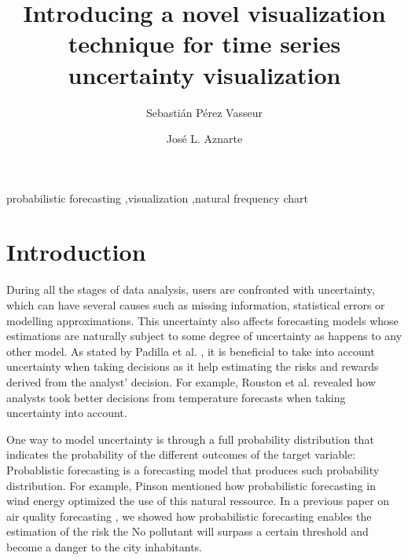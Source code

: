 \documentclass[a4paper,3p,sort&compress]{elsarticle}
\begin{document}
\linenumbers

\newcommand{\no}{NO\textsubscript{2}\xspace}

\begin{frontmatter}

  \title{Introducing a novel visualization technique for time series uncertainty visualization}


  \author{Sebasti\'an P\'erez Vasseur}
  \author{Jos\'e L. Aznarte}
  \address{Artificial Intelligence Department\\Universidad Nacional de
    Educaci\'on a Distancia --- UNED\\c/ Juan del Rosal, 16, Madrid, Spain}
  

\begin{abstract}
  
\end{abstract}

\begin{keyword}
probabilistic forecasting \sep visualization \sep natural frequency chart
\end{keyword}

\end{frontmatter}


\section{Introduction}
\label{sec:intro}

During all the stages of data analysis, users are confronted with uncertainty, which can have 
several causes such as missing information, statistical errors or modelling approximations.
This uncertainty also affects forecasting models whose estimations are naturally 
subject to some degree of uncertainty as happens to any other model. 
As stated by Padilla et al. \cite{padilla_uncertainty_2021}, it is beneficial to take into account uncertainty 
when taking decisions as it help estimating the risks and rewards derived from the analyst'
decision. For example, Rouston et al. \cite{roulston_laboratory_2006} 
revealed how analysts 
took better decisions from temperature forecasts when taking uncertainty into account. 

One way to model uncertainty is through a full 
probability distribution that indicates the probability of the different outcomes of the target variable:
Probablistic forecasting is a forecasting model that produces such probability distribution.
For example, Pinson \cite{pinson_non-parametric_2007} mentioned how probabilistic forecasting 
in wind energy optimized the use of this natural ressource. In a previous paper on air quality forecasting 
\cite{vasseur_comparing_2021}, we showed 
how probabilistic forecasting enables the estimation of the risk the No pollutant will surpass a certain threshold 
and become a danger to the city inhabitants. 
\end{document}
